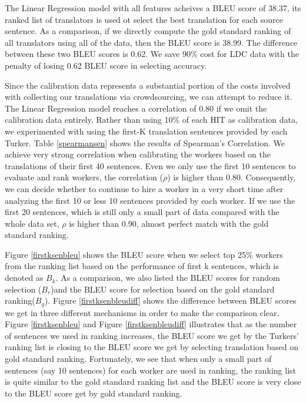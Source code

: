 \documentclass[11pt]{article}
\begin{document}
The Linear Regression model with all features acheives a BLEU score of 38.37, its ranked list of translators  is used ot select the best translation for each source sentence. As a comparison, if we directly compute the gold standard ranking of all translators using all of the data, then the BLEU score is 38.99. The difference between these two BLEU scores is 0.62. We save 90\% cost for LDC data with the penalty of losing 0.62 BLEU score in selecting accuracy.

Since the calibration data represents a substantial portion of the costs involved with collecting our translations via crowdsourcing, we can attempt to reduce it.  
 The Linear Regression model reaches a correlation of 0.80 if we omit the calibration data entirely. 
 Rather than using 10\% of each HIT as calibration data, we experimented with using the first-K translation sentences provided by each Turker.  Table \ref{spearmansen} shows the results of Spearman's Correlation.  We achieve  very strong correlation when calibrating the workers based on  the translations of their first 40 sentences.  
  Even we only use the first 10 sentences to evaluate and rank workers, the correlation ($\rho$) is higher than 0.80.  Consequently, we can decide whether to continue to hire a worker in a very short time after analyzing the first 10 or less 10 sentences provided by each worker. If we use the first 20 sentences, which is still only a small  part of data compared with the whole data set, $\rho$ is higher than 0.90, almost perfect match with the gold standard ranking.
  
  Figure \ref{firstksenbleu}  shows the BLEU score when we select top 25\% workers from the ranking list based on the performance of first k sentences, which is denoted as $B_{k}$.  As a comparison, we also listed the  BLEU scores for random selection ($B_{r}$)and the BLEU score for selection based on the gold standard ranking($B_{g}$).  Figure \ref{firstksenbleudiff}  shows the difference between BLEU scores we get in three different mechanisms in order to make the comparison clear.
  Figure \ref{firstksenbleu} and Figure \ref{firstksenbleudiff} illustrates that as the number of sentences we used in ranking increases, the BLEU score we get by the Turkers' ranking list is closing to the BLEU score we get by selecting translation based on gold standard ranking. Fortunately, we see that when only a small part of sentences (say 10 sentences) for each worker are used in ranking, the ranking list  is quite similar to the gold standard ranking list and the BLEU score is very close to the BLEU score get by gold standard ranking.
  
\end{document}
